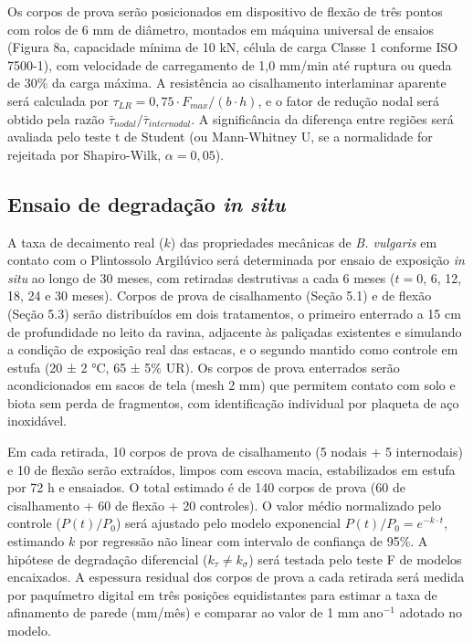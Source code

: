 \documentclass[
  brazilian,
  authoryear,
  preprint]{elsarticle}
\begin{document}
Os corpos de prova serão posicionados em dispositivo de flexão de três
pontos com rolos de 6 mm de diâmetro, montados em máquina universal de
ensaios (Figura 8a, capacidade mínima de 10 kN, célula de carga Classe 1
conforme ISO 7500-1), com velocidade de carregamento de 1,0 mm/min até
ruptura ou queda de 30\% da carga máxima. A resistência ao cisalhamento
interlaminar aparente será calculada por
\(\tau_{LR} = 0{,}75 \cdot F_{max} / (b \cdot h)\), e o fator de redução
nodal será obtido pela razão
\(\bar{\tau}_{nodal} / \bar{\tau}_{internodal}\). A significância da
diferença entre regiões será avaliada pelo teste t de Student (ou
Mann-Whitney U, se a normalidade for rejeitada por Shapiro-Wilk,
\(\alpha = 0{,}05\)).

\subsection{\texorpdfstring{Ensaio de degradação \emph{in
situ}}{Ensaio de degradação in situ}}\label{ensaio-de-degradauxe7uxe3o-in-situ}

A taxa de decaimento real (\(k\)) das propriedades mecânicas de \emph{B.
vulgaris} em contato com o Plintossolo Argilúvico será determinada por
ensaio de exposição \emph{in situ} ao longo de 30 meses, com retiradas
destrutivas a cada 6 meses (\(t = 0\), 6, 12, 18, 24 e 30 meses). Corpos
de prova de cisalhamento (Seção 5.1) e de flexão (Seção 5.3) serão
distribuídos em dois tratamentos, o primeiro enterrado a 15 cm de
profundidade no leito da ravina, adjacente às paliçadas existentes e
simulando a condição de exposição real das estacas, e o segundo mantido
como controle em estufa (20 ± 2 °C, 65 ± 5\% UR). Os corpos de prova
enterrados serão acondicionados em sacos de tela (mesh 2 mm) que
permitem contato com solo e biota sem perda de fragmentos, com
identificação individual por plaqueta de aço inoxidável.

Em cada retirada, 10 corpos de prova de cisalhamento (5 nodais + 5
internodais) e 10 de flexão serão extraídos, limpos com escova macia,
estabilizados em estufa por 72 h e ensaiados. O total estimado é de 140
corpos de prova (60 de cisalhamento + 60 de flexão + 20 controles). O
valor médio normalizado pelo controle (\(P(t)/P_0\)) será ajustado pelo
modelo exponencial \(P(t)/P_0 = e^{-k \cdot t}\), estimando \(k\) por
regressão não linear com intervalo de confiança de 95\%. A hipótese de
degradação diferencial (\(k_\tau \neq k_\sigma\)) será testada pelo
teste F de modelos encaixados. A espessura residual dos corpos de prova
a cada retirada será medida por paquímetro digital em três posições
equidistantes para estimar a taxa de afinamento de parede (mm/mês) e
comparar ao valor de 1 mm ano\(^{-1}\) adotado no modelo.
\end{document}

